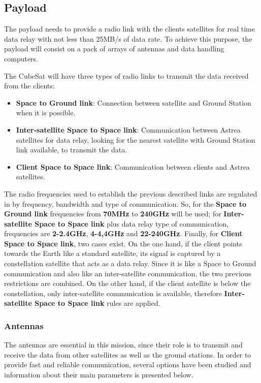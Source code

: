 \subsection{Payload}
The payload needs to provide a radio link with the clients satellites for real time data relay with not less than 25MB/s of data rate. To achieve this purpose, the payload will consist on a pack of arrays of antennas and data handling computers. 

The CubeSat will have three types of radio links to transmit the data received from the clients:
\begin{itemize}
\item \textbf{Space to Ground link}: Connection between satellite and Ground Station when it is possible.
\item \textbf{Inter-satellite Space to Space link}: Communication between Astrea satellites for data relay, looking for the nearest satellite with Ground Station link available, to transmit the data.
\item \textbf{Client Space to Space link}: Communication between clients and Astrea satellites.
\end{itemize}

The radio frequencies used to establish the previous described links are regulated in \cite{SecretariadeEstadodetelecomunicacionesyparalasociedaddelainformacion.2015} by frequency, bandwidth and type of communication. So, for the \textbf{Space to Ground link} frequencies from \textbf{70MHz} to \textbf{240GHz} will be used; for \textbf{Inter-satellite Space to Space link} plus data relay type of communication, frequencies are \textbf{2-2.4GHz}, \textbf{4-4,4GHz} and \textbf{22-240GHz}. Finally, for \textbf{Client Space to Space link}, two cases exist. On the one hand, if the client points towards the Earth like a standard satellite, its signal is captured by a constellation satellite that acts as a data relay. Since it is like a Space to Ground communication and also like an inter-satellite communication, the two previous restrictions are combined. On the other hand, if the client satellite is below the constellation, only inter-satellite communication is available, therefore \textbf{Inter-satellite Space to Space link} rules are applied.

\subsubsection{Antennas}
The antennas are essential in this mission, since their role is to transmit and receive the data from other satellites as well as the ground stations. In order to provide fast and reliable communication, several options have been studied and information about their main parameters is presented below.

